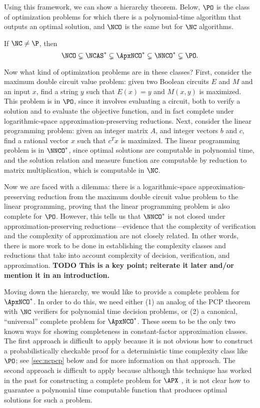 \documentclass{article}
\newcommand{\todo}[1]{\textbf{TODO #1}}
\begin{document}
Using this framework, we can show a hierarchy theorem.
Below, $\PO$ is the class of optimization problems for which there is a polynomial-time algorithm that outputs an optimal solution, and $\NCO$ is the same but for $\NC$ algorithms.

\begin{theorem}
  If $\NC \neq \P$, then
  \begin{equation*}
    \NCO \subsetneq \NCAS^* \subsetneq \ApxNCO^* \subsetneq \NNCO^* \subsetneq \PO.
  \end{equation*}
\end{theorem}

Now what kind of optimization problems are in these classes?
First, consider the maximum double circuit value problem: given two Boolean circuits $E$ and $M$ and an input $x$, find a string $y$ such that $E(x) = y$ and $M(x, y)$ is maximized.
This problem is in $\PO$, since it involves evaluating a circuit, both to verify a solution and to evaluate the objective function, and in fact complete under logarithmic-space approximation-preserving reductions.
Next, consider the linear programming problem: given an integer matrix $A$, and integer vectors $b$ and $c$, find a rational vector $x$ such that $c^T x$ is maximized.
The linear programming problem is in $\NNCO^*$, since optimal solutions are computable in polynomial time, and the solution relation and measure function are computable by reduction to matrix multiplication, which is computable in $\NC$.

Now we are faced with a dilemma: there is a logarithmic-space approximation-preserving reduction from the maximum double circuit value problem to the linear programming, proving that the linear programming problem is also complete for $\PO$.
However, this tells us that $\NNCO^*$ is not closed under approximation-preserving reductions---evidence that the complexity of verification and the complexity of approximation are not closely related.
In other words, there is more work to be done in establishing the complexity classes and reductions that take into account complexity of decision, verification, and approximation.
\todo{This is a key point; reiterate it later and/or mention it in an introduction.}

Moving down the hierarchy, we would like to provide a complete problem for $\ApxNCO^*$.
In order to do this, we need either (1) an analog of the PCP theorem with $\NC$ verifiers for polynomial time decision problems, or (2) a canonical, ``universal'' complete problem for $\ApxNCO^*$.
These seem to be the only two known ways for showing completeness in constant-factor approximation classes.
The first approach is difficult to apply because it is not obvious how to construct a probabilistically checkable proof for a deterministic time complexity class like $\PO$; see \autoref{sec:ncpcp} below and \autocite{ncpcp} for more information on that approach.
The second approach is difficult to apply because although this technique has worked in the past for constructing a complete problem for $\APX$ \autocite[Lemma~2]{cp91}, it is not clear how to guarantee a polynomial time computable function that produces optimal solutions for such a problem.
\end{document}
